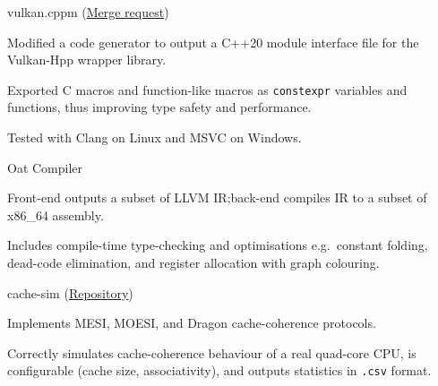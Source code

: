 \begin{cventries}
	{vulkan.cppm \footnotesize{(\href{https://github.com/KhronosGroup/Vulkan-Hpp/pull/1582}{Merge request})}} %
	{} %
	{} %
	{
		\begin{cvitems} %
			\item Modified a code generator to output a C++20 module interface file for the Vulkan-Hpp wrapper library.
			\item Exported C macros and function-like macros as \texttt{constexpr} variables and functions, thus improving type safety and performance.
			\item Tested with Clang on Linux and MSVC on Windows.
		\end{cvitems}
	}

	{Oat Compiler} %
	{} %
	{} %
	{
		\begin{cvitems} %
			\item Front-end outputs a subset of LLVM IR;\@ back-end compiles IR to a subset of x86\_64 assembly.
			\item Includes compile-time type-checking and optimisations e.g.\ constant folding, dead-code elimination, and register allocation with graph colouring.
		\end{cvitems}
	}


	{cache-sim \footnotesize(\href{https://github.com/sharadhr/cs4223-cache-sim}{Repository})} %
	{} %
	{} %
	{
		\begin{cvitems} %
			\item Implements MESI, MOESI, and Dragon cache-coherence protocols.
			\item Correctly simulates cache-coherence behaviour of a real quad-core CPU, is configurable (cache size, associativity), and outputs statistics in \texttt{.csv} format.
		\end{cvitems}
	}


\end{cventries}
